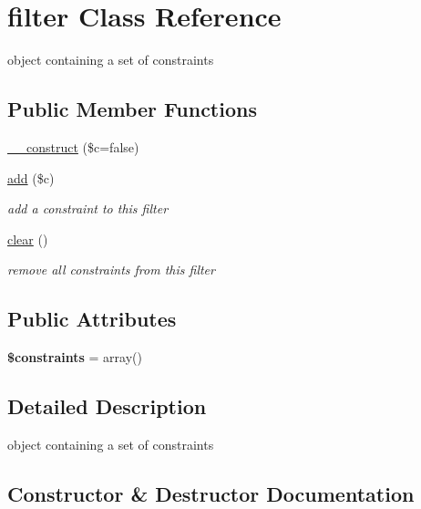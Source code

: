 \hypertarget{classfilter}{}\section{filter Class Reference}
\label{classfilter}


object containing a set of constraints  


\subsection*{Public Member Functions}
\begin{DoxyCompactItemize}
\item 
\hyperlink{classfilter_a4450fa4f5c5650cc2f9977cfe3e46f07}{\+\_\+\+\_\+construct} (\$c=false)
\item 
\hyperlink{classfilter_ab8a6f36222725436d225a0494867147c}{add} (\$c)
\begin{DoxyCompactList}\small\item\em add a constraint to this filter \end{DoxyCompactList}\item 
\hypertarget{classfilter_a439738ea679da2927ae93629c8fa0f35}{}\hyperlink{classfilter_a439738ea679da2927ae93629c8fa0f35}{clear} ()\label{classfilter_a439738ea679da2927ae93629c8fa0f35}

\begin{DoxyCompactList}\small\item\em remove all constraints from this filter \end{DoxyCompactList}\end{DoxyCompactItemize}
\subsection*{Public Attributes}
\begin{DoxyCompactItemize}
\item 
\hypertarget{classfilter_aec248d073939e1934ee24de4fd4ec6fd}{}{\bfseries \$constraints} = array()\label{classfilter_aec248d073939e1934ee24de4fd4ec6fd}

\end{DoxyCompactItemize}


\subsection{Detailed Description}
object containing a set of constraints 

\subsection{Constructor \& Destructor Documentation}
\hypertarget{classfilter_a4450fa4f5c5650cc2f9977cfe3e46f07}{}
